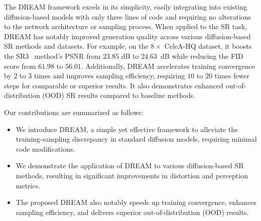 The DREAM framework excels in its simplicity, easily integrating into existing diffusion-based models with only three lines of code and requiring no alterations to the network architecture or sampling process. When applied to the SR task, DREAM has notably improved generation quality across various diffusion-based SR methods and datasets. For example, on the $8\times$ CeleA-HQ dataset, it boosts the SR3~\cite{saharia2022image} method's PSNR from $23.85$ dB to $24.63$~dB while reducing the FID score from $61.98$ to $56.01$. Additionally, DREAM accelerates training convergence by $2$ to $3$ times and improves sampling efficiency, requiring $10$ to $20$ times fewer steps for comparable or superior results. It also demonstrates enhanced out-of-distribution (OOD) SR results compared to baseline methods.

Our contributions are summarized as follows:
\begin{itemize}
    \item We introduce DREAM, a simple yet effective framework to alleviate the training-sampling discrepancy in standard diffusion models, requiring minimal code modifications.
    \item We demonstrate the application of DREAM to various diffusion-based SR methods, resulting in significant improvements in distortion and perception metrics.
    \item The proposed DREAM also notably speeds up training convergence, enhances sampling efficiency, and delivers superior out-of-distribution (OOD) results.
\end{itemize}

